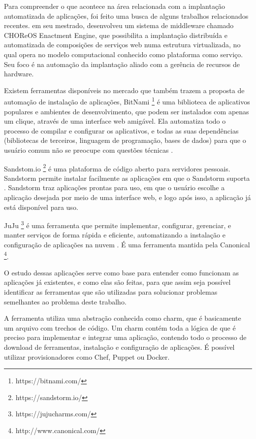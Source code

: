 Para compreender o que acontece na área relacionada com a implantação
automatizada de aplicações, foi feito uma busca de alguns trabalhos relacionados 
recentes.  em seu mestrado,
desenvolveu um sistema de middleware chamado CHOReOS Enactment Engine, que possibilita a implantação distribuída e automatizada de composições
de serviços web numa estrutura virtualizada, no qual opera no modelo
computacional conhecido como plataforma como serviço. Seu foco é na automação da 
implantação aliado com a gerência de recursos de 
hardware.

Existem ferramentas disponíveis no mercado que também trazem a proposta
de automação de instalação de aplicações, BitNami \footnote{https://bitnami.com/} é uma 
biblioteca de aplicativos populares e ambientes de desenvolvimento, 
que podem ser instalados com apenas um clique, 
através de uma interface web amigável. Ela automatiza todo o processo de 
compilar e configurar os aplicativos, 
e todas as suas dependências (bibliotecas de terceiros, linguagem de programação, 
bases de dados) para que o usuário comum não se preocupe com questões técnicas \cite{bitnami}. 

Sandstom.io \footnote{https://sandstorm.io/} é uma plataforma de código aberto para servidores
pessoais. Sandstorm permite instalar
facilmente as aplicações em que o Sandstorm 
suporta \cite{sandstormio}. Sandstorm traz aplicações prontas para uso, 
em que o usuário escolhe a aplicação desejada  por meio de uma interface web, 
e logo após isso, a aplicação já está disponível para uso.

JuJu \footnote{https://jujucharms.com/} é uma ferramenta que permite 
implementar, configurar, gerenciar, 
e manter serviços de forma rápida e eficiente, automatizando a instalação e 
configuração de aplicações na nuvem \cite{juju}. É uma ferramenta mantida pela Canonical \footnote{http://www.canonical.com/}. 

O estudo dessas aplicações serve como base para entender como funcionam as aplicações
já existentes, e como elas são feitas, para que assim seja possível identificar
as ferramentas que são utilizadas para solucionar problemas semelhantes ao problema deste
trabalho. 

A ferramenta  utiliza uma abstração conhecida como charm,
que é basicamente um arquivo com trechos de código. Um charm
contém toda a lógica de que é preciso para implementar e integrar uma aplicação,
contendo todo o processo de download de ferramentas, instalação e configuração de
aplicações. É possível utilizar provisionadores como Chef, Puppet ou Docker. 

